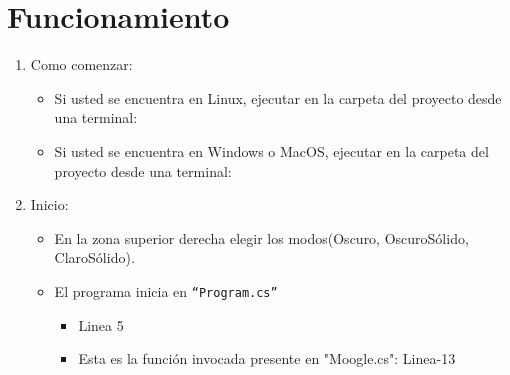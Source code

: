 \documentclass{article}
\begin{document}
\section{Funcionamiento}
\begin{enumerate}
    \item Como comenzar:
        \begin{itemize}
            \item Si usted se encuentra en Linux, ejecutar en la carpeta del proyecto desde una terminal:
        

            \item Si usted se encuentra en Windows o MacOS, ejecutar en la carpeta del proyecto desde una terminal: 
            
        \end{itemize}
    \item Inicio:
        \begin{itemize}
            \item En la zona superior derecha elegir los modos(Oscuro, OscuroSólido, ClaroSólido).
            \item El programa inicia en \texttt{``Program.cs''}
            \begin{itemize}
                \item Linea 5 
                \item Esta es la función invocada presente en "Moogle.cs": Linea-13 
                

\end{itemize}
\end{itemize}
\end{enumerate}
\end{document}
